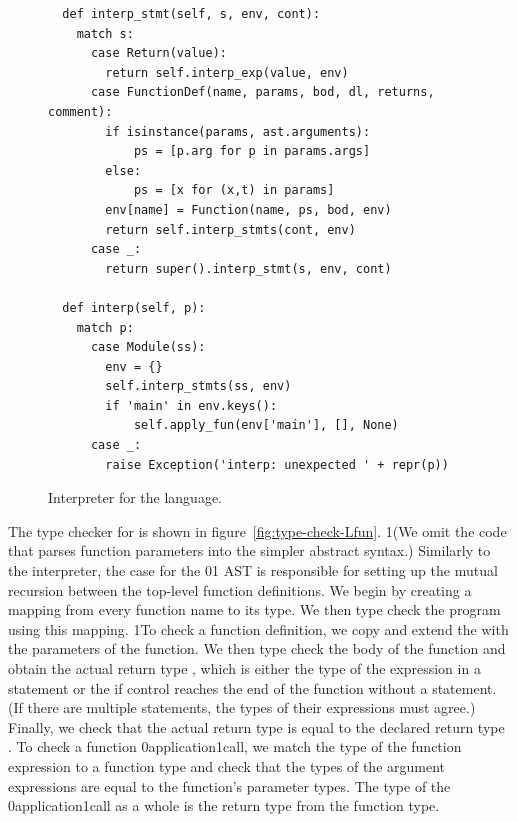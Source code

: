 \documentclass[7x10]{TimesAPriori_MIT}%
\def\racketEd{0}
\def\pythonEd{1}
\providecommand{\BookEdition}{1}
\let\edition\BookEdition
\newcommand{\racket}[1]{{\if\edition\racketEd{#1}\fi}}
\newcommand{\pythonColor}[0]{}
\newcommand{\python}[1]{{\if\edition\pythonEd\pythonColor #1\fi}}
\numberwithin{theorem}{chapter}
\numberwithin{definition}{chapter}
\numberwithin{equation}{chapter}
\begin{document}
\begin{figure}[tp]
\begin{tcolorbox}[colback=white]
{\begin{lstlisting}
  def interp_stmt(self, s, env, cont):
    match s:
      case Return(value):
        return self.interp_exp(value, env)
      case FunctionDef(name, params, bod, dl, returns, comment):
        if isinstance(params, ast.arguments):
            ps = [p.arg for p in params.args]
        else:
            ps = [x for (x,t) in params]
        env[name] = Function(name, ps, bod, env)
        return self.interp_stmts(cont, env)
      case _:
        return super().interp_stmt(s, env, cont)
    
  def interp(self, p):
    match p:
      case Module(ss):
        env = {}
        self.interp_stmts(ss, env)
        if 'main' in env.keys():
            self.apply_fun(env['main'], [], None)
      case _:
        raise Exception('interp: unexpected ' + repr(p))
\end{lstlisting}
\fi}
  \end{tcolorbox}

  \caption{Interpreter for the \LangFun{} language.}
\label{fig:interp-Lfun}
\end{figure}



The type checker for \LangFun{} is shown in
figure~\ref{fig:type-check-Lfun}.
%
\python{(We omit the code that parses function parameters into the
  simpler abstract syntax.)}
%
Similarly to the interpreter, the case for the
\racket{}\python{}
%
AST is responsible for setting up the mutual recursion between the
top-level function definitions. We begin by creating a mapping
 from every function name to its type. We then type check
the program using this mapping.
%
\python{To check a function definition, we copy and extend the
  \code{env} with the parameters of the function. We then type check
  the body of the function and obtain the actual return type
  \code{rt}, which is either the type of the expression in a
  \code{return} statement or the \code{VoidType} if control reaches
  the end of the function without a \code{return} statement.  (If
  there are multiple \code{return} statements, the types of their
  expressions must agree.) Finally, we check that the actual return
  type \code{rt} is equal to the declared return type \code{returns}.}
%
To check a function \racket{application}\python{call}, we match
the type of the function expression to a function type and check that
the types of the argument expressions are equal to the function's
parameter types. The type of the \racket{application}\python{call} as
a whole is the return type from the function type.
\end{document}
